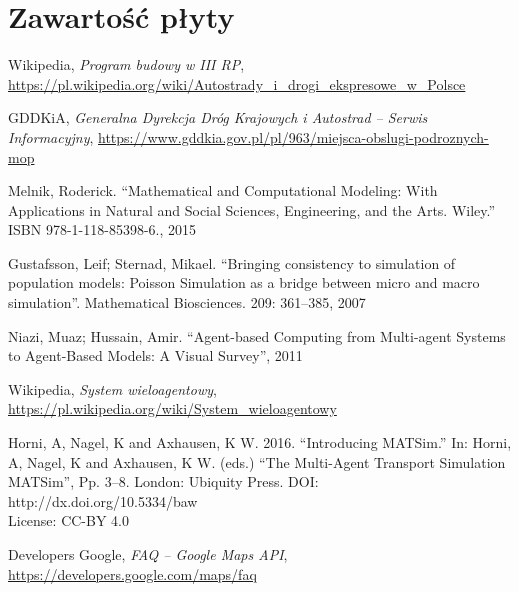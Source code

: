 \chapter{Zawartość płyty}

\begin{thebibliography}{99}

 Wikipedia, \textit{Program budowy w III RP},\\ \url{https://pl.wikipedia.org/wiki/Autostrady\_i\_drogi\_ekspresowe\_w\_Polsce}

 GDDKiA, \textit{Generalna Dyrekcja Dróg Krajowych i Autostrad -- Serwis Informacyjny}, \url{https://www.gddkia.gov.pl/pl/963/miejsca-obslugi-podroznych-mop}

Melnik, Roderick. ``Mathematical and Computational Modeling: With Applications in Natural and Social Sciences, Engineering, and the Arts. Wiley.'' ISBN 978-1-118-85398-6., 2015

Gustafsson, Leif; Sternad, Mikael. ``Bringing consistency to simulation of population models: Poisson Simulation as a bridge between micro and macro simulation''. Mathematical Biosciences. 209: 361–385, 2007

 Niazi, Muaz; Hussain, Amir. ``Agent-based Computing from Multi-agent Systems to Agent-Based Models: A Visual Survey'', 2011

 Wikipedia, \textit{System wieloagentowy},\\ \url{https://pl.wikipedia.org/wiki/System_wieloagentowy}

 Horni, A, Nagel, K and Axhausen, K W. 2016. ``Introducing MATSim.'' In: Horni, A, Nagel, K and
Axhausen, K W. (eds.) ``The Multi-Agent Transport Simulation MATSim'', Pp. 3–8. London: Ubiquity Press. DOI: http://dx.doi.org/10.5334/baw \\ License: CC-BY 4.0

 Developers Google, \textit{FAQ -- Google Maps API},\\ \url{https://developers.google.com/maps/faq}

\end{thebibliography}




